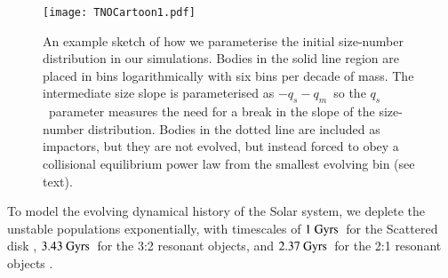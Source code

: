 \documentclass[printer]{aa}
\newcommand{\revised}{\color{black}}
\begin{document}
\begin{figure}
  \texttt{[image: TNOCartoon1.pdf]}
  \caption{An example sketch of how we parameterise the initial size-number distribution in our simulations.  Bodies in the solid line region are placed in bins logarithmically with six bins per decade of mass.  {\revised The intermediate size slope is parameterised as $-q_s-q_m$~so the $q_s$~parameter measures the need for a break in the slope of the size-number distribution.}  Bodies in the dotted line are included as impactors, but they are not evolved, but instead forced to obey a collisional equilibrium power law from the smallest evolving bin (see text).}
  \label{fig:examplesizedis}
\end{figure}

To model the evolving dynamical history of the Solar system, we deplete the unstable populations exponentially, with timescales of $1~\rm{Gyrs}$~for the Scattered disk \citep{1997Sci...276.1670D}, $3.43~\rm{Gyrs}$~for the 3:2 resonant objects, and $2.37~\rm{Gyrs}$~for the 2:1 resonant objects \citep{2009AJ....138..827T}.
\end{document}
